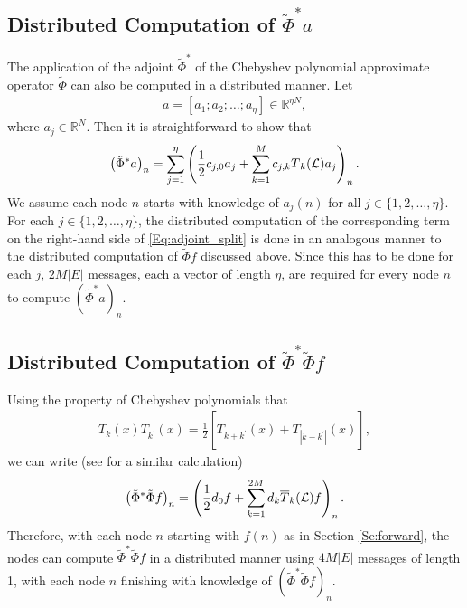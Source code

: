 \documentclass[conference]{IEEEtran}
\newcommand{\Rbb}{\mathbb{R}}
\renewcommand{\L}{{\mathcal{L}}}
\def\L{{\cal L}}
\begin{document}
\subsection{Distributed Computation of $\tilde{\Phi}^*a$} \label{Se:adj_d}
The application of the adjoint $\tilde{\Phi}^*$ of the Chebyshev polynomial approximate operator $\tilde{\Phi}$ can also be computed in a distributed manner. Let
\begin{eqnarray*}
a  = \left[ a_1; a_2; \ldots; a_{\eta} \right] \in \Rbb^{\eta N},
\end{eqnarray*}
where $a_j \in \Rbb^N$. Then it is straightforward to show that
\begin{align}\label{Eq:adjoint_split}
\left(\tilde{\Phi}^*a\right)_n=\sum_{j=1}^{\eta}\left(\frac{1}{2}c_{j,0}a_j+\sum_{k=1}^{M}c_{j,k}\overline{T}_k(\L)a_j \right)_n.
\end{align}
We assume each node $n$ starts with knowledge of $a_j(n)$ for all $j \in \{1,2,\ldots,\eta\}$. For each $j \in \{1,2,\ldots,\eta\}$, the distributed computation of the corresponding term on the right-hand side of \eqref{Eq:adjoint_split} is done in an analogous manner to the distributed computation of $\tilde{\Phi}f$ discussed above. Since this has to be done for each $j$, $2M|E|$ messages, each a vector of length $\eta$, are required for every node $n$ to compute $\left(\tilde{\Phi}^*a\right)_n$.

\subsection{Distributed Computation of $\tilde{\Phi}^*\tilde{\Phi}f$}\label{Se:wwstar} Using the property of Chebyshev polynomials that
\begin{eqnarray*}
T_k(x)T_{k^{\prime}}(x)=\frac{1}{2}\left[T_{k+k^{\prime}}(x)+T_{|k-k^{\prime}|}(x) \right],
\end{eqnarray*}
we can write (see \cite{LTS-ARTICLE-2009-053} for a similar calculation)
\begin{eqnarray*}
\left(\tilde{\Phi}^*\tilde{\Phi}f\right)_n=\left(\frac{1}{2}d_0 f + \sum_{k=1}^{2M} d_k \overline{T}_k(\L)f \right)_n.
\end{eqnarray*}
Therefore, with each node $n$ starting with $f(n)$ as in Section \ref{Se:forward}, the nodes can compute $\tilde{\Phi}^*\tilde{\Phi}f$ in a distributed manner using $4M|E|$ messages of length 1, with each node $n$ finishing with knowledge of $\left(\tilde{\Phi}^*\tilde{\Phi}f\right)_n$.
\end{document}
